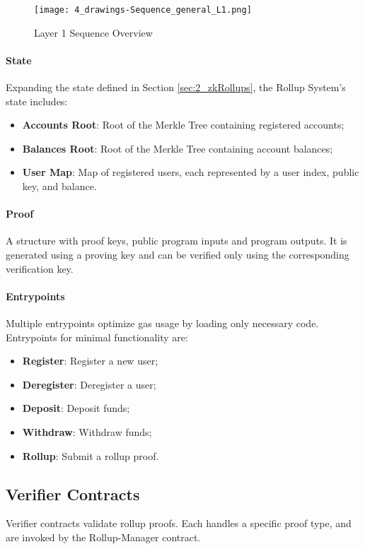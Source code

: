 \begin{figure}[ht]
  \centering
  \texttt{[image: 4\_drawings-Sequence\_general\_L1.png]}
  \caption{Layer 1 Sequence Overview}
  \label{fig:Layer1sequencediagram}
\end{figure}

\paragraph{State}
Expanding the state defined in Section \ref{sec:2_zkRollups}, the Rollup System's state includes:
\begin{itemize}
  \item \textbf{Accounts Root}: Root of the Merkle Tree containing registered accounts;
  \item \textbf{Balances Root}: Root of the Merkle Tree containing account balances;
  \item \textbf{User Map}: Map of registered users, each represented by a user index, public key, and balance.
\end{itemize}

\paragraph{Proof}
A structure with proof keys, public program inputs and program outputs. It is generated using a proving key and can be verified only using the corresponding verification key.

\paragraph{Entrypoints}
Multiple entrypoints optimize gas usage by loading only necessary code. Entrypoints for minimal functionality are:
\begin{itemize}
  \item \textbf{Register}: Register a new user;
  \item \textbf{Deregister}: Deregister a user;
  \item \textbf{Deposit}: Deposit funds;
  \item \textbf{Withdraw}: Withdraw funds;
  \item \textbf{Rollup}: Submit a rollup proof.
\end{itemize}

\subsection{Verifier Contracts\label{sec:designverifiercontracts}}
Verifier contracts validate rollup proofs. Each handles a specific proof type, and are invoked by the Rollup-Manager contract.

